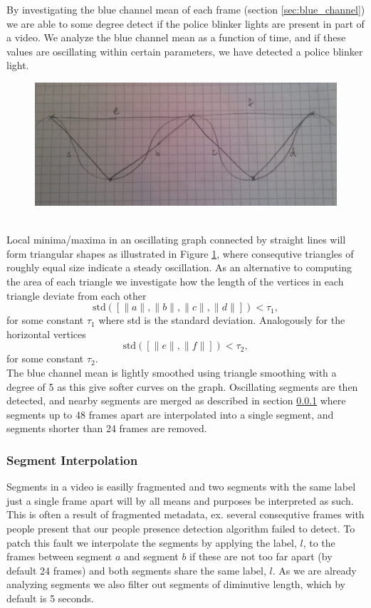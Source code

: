 By investigating the blue channel mean of each frame (section \ref{sec:blue_channel}) we are able to some degree detect if the police blinker lights are present in part of a video. We analyze the blue channel mean as a function of time, and if these values are oscillating within certain parameters, we have detected a police blinker light.
%
\begin{figure}[h]
     \centering
     \includegraphics[width=1.05\textwidth]{img/triangles.jpg}
     \caption{}\label{fig:triangles}
\end{figure}\\
%
Local minima/maxima in an oscillating graph connected by straight lines will form triangular shapes as illustrated in Figure \ref{fig:triangles}, where consequtive triangles of roughly equal size indicate a steady oscillation. As an alternative to computing the area of each triangle we investigate how the length of the vertices in each triangle deviate from each other
\[
\text{std}([\|a\|,\|b\|,\|c\|,\|d\|]) < \tau_1,
\]
for some constant $\tau_1$ where std is the standard deviation. Analogously for the horizontal vertices
\[
\text{std}([\|e\|,\|f\|]) < \tau_2,
\]
for some constant $\tau_2$.\\
The blue channel mean is lightly smoothed using triangle smoothing with a degree of 5 as this give softer curves on the graph. Oscillating segments are then detected, and nearby segments are merged as described in section \ref{sec:labelmerge} where segments up to 48 frames apart are interpolated into a single segment, and segments shorter than 24 frames are removed.
%
\subsubsection{Segment Interpolation}\label{sec:labelmerge}
%
Segments in a video is easilly fragmented and two segments with the same label just a single frame apart will by all means and purposes be interpreted as such. This is often a result of fragmented metadata, ex. several consequtive frames with people present that our people presence detection algorithm failed to detect. To patch this fault we interpolate the segments by applying the label, $l$, to the frames between segment $a$ and segment $b$ if these are not too far apart (by default 24 frames) and both segments share the same label, $l$. As we are already analyzing segments we also filter out segments of diminutive length, which by default is 5 seconds.
%
